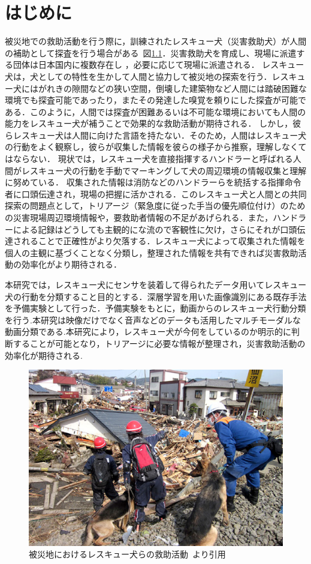 \chapter{はじめに}
被災地での救助活動を行う際に，訓練されたレスキュー犬（災害救助犬）が人間の補助として探査を行う場合がある~図\ref{resque}．災害救助犬を育成し、現場に派遣する団体は日本国内に複数存在し
，必要に応じて現場に派遣される．
レスキュー犬は，犬としての特性を生かして人間と協力して被災地の探索を行う．レスキュー犬にはがれきの隙間などの狭い空間，倒壊した建築物など人間には踏破困難な環境でも探査可能であったり，またその発達した嗅覚を頼りにした探査が可能である．このように，人間では探査が困難あるいは不可能な環境においても人間の能力をレスキュー犬が補うことで効果的な救助活動が期待される．
しかし，彼らレスキュー犬は人間に向けた言語を持たない．そのため，人間はレスキュー犬の行動をよく観察し，彼らが収集した情報を彼らの様子から推察，理解しなくてはならない．
現状では，レスキュー犬を直接指揮するハンドラーと呼ばれる人間がレスキュー犬の行動を手動でマーキングして犬の周辺環境の情報収集と理解に努めている．
収集された情報は消防などのハンドラーらを統括する指揮命令者に口頭伝達され，現場の把握に活かされる．このレスキュー犬と人間との共同探索の問題点として，トリアージ（緊急度に従った手当の優先順位付け）のための災害現場周辺環境情報や，要救助者情報の不足があげられる．また，ハンドラーによる記録はどうしても主観的にな流ので客観性に欠け，さらにそれが口頭伝達されることで正確性がより欠落する．レスキュー犬によって収集された情報を個人の主観に基づくことなく分類し，整理された情報を共有できれば災害救助活動の効率化がより期待される．

本研究では，レスキュー犬にセンサを装着して得られたデータ用いてレスキュー犬の行動を分類すること目的とする．深層学習を用いた画像識別にある既存手法を予備実験として行った．予備実験をもとに，動画からのレスキュー犬行動分類を行う.本研究は映像だけでなく音声などのデータも活用したマルチモーダルな動画分類である.本研究により，レスキュー犬が今何をしているのか明示的に判断することが可能となり，トリアージに必要な情報が整理され，災害救助活動の効率化が期待される.
\begin{figure}[htbp]
 \begin{center}
  \includegraphics[width=12cm]{./Figures/resque.eps}
  \caption{被災地におけるレスキュー犬らの救助活動~\cite{buycott}より引用}
  \label{resque}
 \end{center}
\end{figure}
